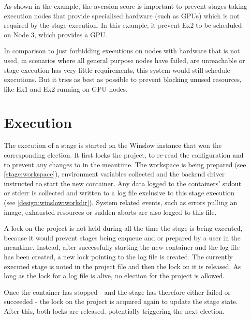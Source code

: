 As shown in the example, the aversion score is important to prevent stages taking execution nodes that provide specialised hardware (such as GPUs) which is not required by the stage execution.
In this example, it prevent Ex2 to be scheduled on Node 3, which provides a GPU.

In comparison to just forbidding executions on nodes with hardware that is not used, in scenarios where all general purpose nodes have failed, are unreachable or stage execution has very little requirements, this system would still schedule executions.
But it tries as best as possible to prevent blocking unused resources, like Ex1 and Ex2 running on GPU nodes.

\section{Execution}

The execution of a stage is started on the Winslow instance that won the corresponding election.
It first locks the project, to re-read the configuration and to prevent any changes to in the meantime.
The workspace is being prepared (see \autoref{stage:workspace}), environment variables collected and the backend driver instructed to start the new container.
Any data logged to the containers' stdout or stderr is collected and written to a log file exclusive to this stage execution (see \autoref{design:winslow:workdir}).
System related events, such as errors pulling an image, exhausted resources or sudden aborts are also logged to this file.

A lock on the project is not held during all the time the stage is being executed, because it would prevent stages being enqueue and or prepared by a user in the meantime.
Instead, after successfully starting the new container and the log file has been created, a new lock pointing to the log file is created.
The currently executed stage is noted in the project file and then the lock on it is released.
As long as the lock for a log file is alive, no election for the project is allowed.

Once the container has stopped - and the stage has therefore either failed or succeeded - the lock on the project is acquired again to update the stage state.
After this, both locks are released, potentially triggering the next election.

